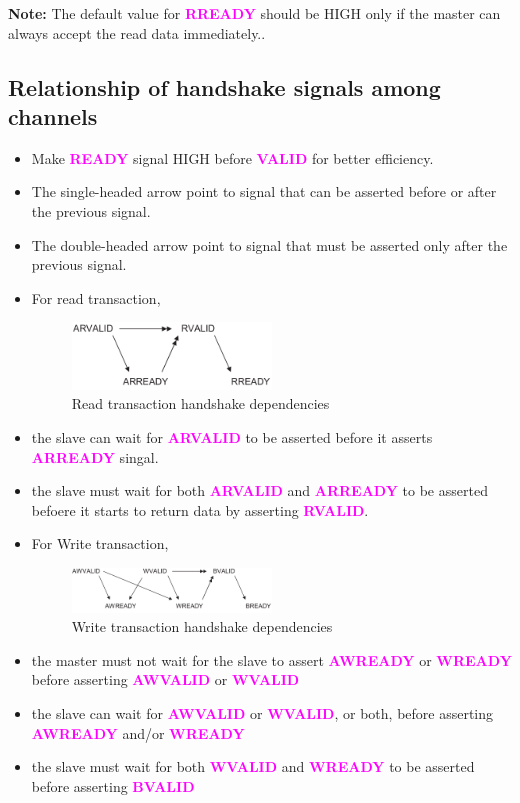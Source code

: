 \documentclass{article}
\newcommand{\AXISignals}[1]{\textbf{\textcolor{magenta}{#1}}}
\begin{document}
\textbf{Note: } The default value for \AXISignals{RREADY} should be HIGH only if the master can always accept the read data immediately..

\subsection{Relationship of handshake signals among channels}
\begin{itemize}
    \item Make \AXISignals{READY} signal HIGH before \AXISignals{VALID} for better efficiency.
    \item The single-headed arrow point to signal that can be asserted before or after the previous signal.
    \item The double-headed arrow point to signal that must be asserted only after the previous signal.
    \item For read transaction,
          \begin{figure}[H]
              \centering
              \includegraphics[width=0.5\textwidth]{Resources/ReadtransactionHandshakeDependencies.png}
              \caption{Read transaction handshake dependencies}
          \end{figure}
    \item the slave can wait for \AXISignals{ARVALID} to be asserted before it asserts \AXISignals{ARREADY} singal.
    \item the slave must wait for both \AXISignals{ARVALID} and \AXISignals{ARREADY} to be asserted befoere it starts to return data by asserting \AXISignals{RVALID}.
    \item For Write transaction,
          \begin{figure}[H]
              \centering
              \includegraphics[width=0.5\textwidth]{Resources/WritetransactionHandshakeDependencies.png}
              \caption{Write transaction handshake dependencies}
          \end{figure}
    \item the master must not wait for the slave to assert \AXISignals{AWREADY} or \AXISignals{WREADY} before asserting \AXISignals{AWVALID} or \AXISignals{WVALID}
    \item the slave can wait for \AXISignals{AWVALID} or \AXISignals{WVALID}, or both, before asserting \AXISignals{AWREADY} and/or \AXISignals{WREADY}
    \item the slave must wait for both \AXISignals{WVALID} and \AXISignals{WREADY} to be asserted before asserting \AXISignals{BVALID}
\end{itemize}
\end{document}
